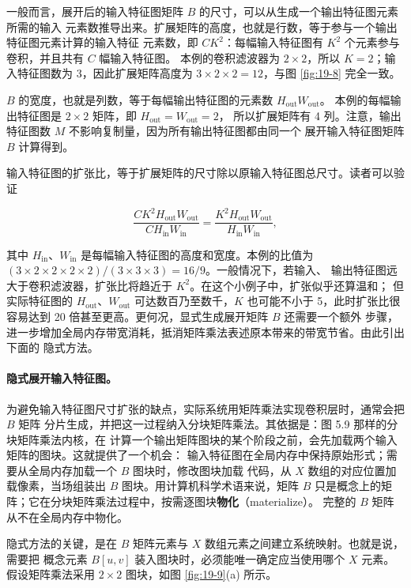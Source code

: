 一般而言，展开后的输入特征图矩阵 $B$ 的尺寸，可以从生成一个输出特征图元素所需的输入
元素数推导出来。扩展矩阵的高度，也就是行数，等于参与一个输出特征图元素计算的输入特征
元素数，即 $CK^2$：每幅输入特征图有 $K^2$ 个元素参与卷积，并且共有 $C$ 幅输入特征图。
本例的卷积滤波器为 $2\times2$，所以 $K=2$；输入特征图数为 3，因此扩展矩阵高度为
$3\times2\times2=12$，与图 \ref{fig:19-8} 完全一致。

$B$ 的宽度，也就是列数，等于每幅输出特征图的元素数 $H_{\mathrm{out}}W_{\mathrm{out}}$。
本例的每幅输出特征图是 $2\times2$ 矩阵，即 $H_{\mathrm{out}}=W_{\mathrm{out}}=2$，
所以扩展矩阵有 4 列。注意，输出特征图数 $M$ 不影响复制量，因为所有输出特征图都由同一个
展开输入特征图矩阵 $B$ 计算得到。

输入特征图的扩张比，等于扩展矩阵的尺寸除以原输入特征图总尺寸。读者可以验证

\begin{equation}
 \frac{CK^2H_{\mathrm{out}}W_{\mathrm{out}}}
      {CH_{\mathrm{in}}W_{\mathrm{in}}}
 =\frac{K^2H_{\mathrm{out}}W_{\mathrm{out}}}
       {H_{\mathrm{in}}W_{\mathrm{in}}},
\label{eq:ch19-expansion-ratio}
\end{equation}

其中 $H_{\mathrm{in}}$、$W_{\mathrm{in}}$ 是每幅输入特征图的高度和宽度。本例的比值为
$(3\times2\times2\times2\times2)/(3\times3\times3)=16/9$。一般情况下，若输入、
输出特征图远大于卷积滤波器，扩张比将趋近于 $K^2$。在这个小例子中，扩张似乎还算温和；
但实际特征图的 $H_{\mathrm{out}}$、$W_{\mathrm{out}}$ 可达数百乃至数千，$K$ 也可能不小于
5，此时扩张比很容易达到 20 倍甚至更高。更何况，显式生成展开矩阵 $B$ 还需要一个额外
步骤，进一步增加全局内存带宽消耗，抵消矩阵乘法表述原本带来的带宽节省。由此引出下面的
隐式方法。

\paragraph{隐式展开输入特征图。}
为避免输入特征图尺寸扩张的缺点，实际系统用矩阵乘法实现卷积层时，通常会把 $B$ 矩阵
分片生成，并把这一过程纳入分块矩阵乘法。其依据是：图 5.9 那样的分块矩阵乘法内核，在
计算一个输出矩阵图块的某个阶段之前，会先加载两个输入矩阵的图块。这就提供了一个机会：
输入特征图在全局内存中保持原始形式；需要从全局内存加载一个 $B$ 图块时，修改图块加载
代码，从 $X$ 数组的对应位置加载像素，当场组装出 $B$ 图块。用计算机科学术语来说，矩阵
$B$ 只是概念上的矩阵；它在分块矩阵乘法过程中，按需逐图块\textbf{物化}（materialize）。
完整的 $B$ 矩阵从不在全局内存中物化。

隐式方法的关键，是在 $B$ 矩阵元素与 $X$ 数组元素之间建立系统映射。也就是说，需要把
概念元素 $B[u,v]$ 装入图块时，必须能唯一确定应当使用哪个 $X$ 元素。假设矩阵乘法采用
$2\times2$ 图块，如图 \ref{fig:19-9}(a) 所示。


